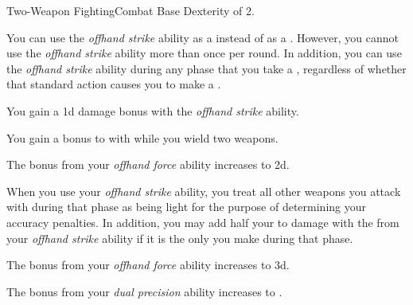     \begin{feat}{Two-Weapon Fighting}{Combat}
        \featpre Base Dexterity of 2.

         You can use the \textit{offhand strike} ability as a  instead of as a .
        However, you cannot use the \textit{offhand strike} ability more than once per round.
        In addition, you can use the \textit{offhand strike} ability during any phase that you take a , regardless of whether that standard action causes you to make a .

         You gain a \plus1d damage bonus with the \textit{offhand strike} ability.

         You gain a  bonus to  with  while you wield two weapons.

         The bonus from your \textit{offhand force} ability increases to \plus2d.

         When you use your \textit{offhand strike} ability, you treat all other weapons you attack with during that phase as being light for the purpose of determining your accuracy penalties.
        In addition, you may add half your  to damage with the  from your \textit{offhand strike} ability if it is the only  you make during that phase.

         The bonus from your \textit{offhand force} ability increases to \plus3d.

         The bonus from your \textit{dual precision} ability increases to .
    \end{feat}

